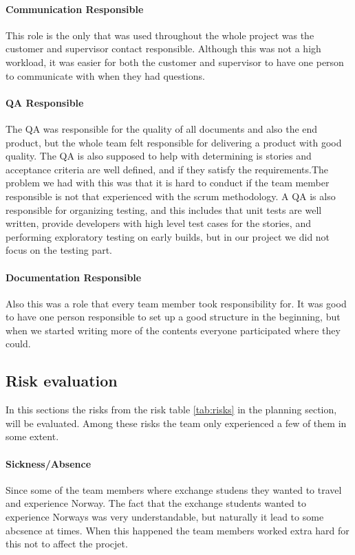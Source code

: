 \paragraph{Communication Responsible}
This role is the only that was used throughout the whole project was the customer and supervisor contact responsible. Although this was not a high workload, it was easier for both the customer and supervisor to have one person to communicate with when they had questions.  

\paragraph{QA Responsible}
The QA was responsible for the quality of all documents and also the end product, but the whole team felt responsible for delivering a product with good quality. The QA is also supposed to help with determining is stories and acceptance criteria are well defined, and if they satisfy the requirements.The problem we had with this was that it is hard to conduct if the team member responsible is not that experienced with the scrum methodology. A QA is also responsible for organizing testing, and this includes that unit tests are well written, provide developers with high level test cases for the stories, and performing exploratory testing on early builds, but in our project we did not focus on the testing part. 

\paragraph{Documentation Responsible}
Also this was a role that every team member took responsibility for. It was good to have one person responsible to set up a good structure in the beginning, but when we started writing more of the contents everyone participated where they could. 

\subsection{Risk evaluation}
In this sections the risks from the risk table \ref{tab:risks} in the planning section, will be evaluated. Among these risks the team only experienced a few of them in some extent.

\paragraph{Sickness/Absence}
Since some of the team members where exchange studens they wanted to travel and experience Norway. The fact that the exchange students wanted to experience Norways was very understandable, but naturally it lead to some abcsence at times. When this happened the team members worked extra hard for this not to affect the procjet. 

